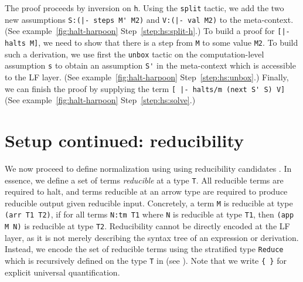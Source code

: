 The proof proceeds by inversion on \lstinline!h!.
Using the \lstinline!split! tactic, we add the two new
assumptions \lstinline!S:(|- steps M' M2)! and
\lstinline!V:(|- val M2)!
to the meta-context. %
(See \Harpoon{} example~\ref{fig:halt-harpoon} Step~\ref{step:hs:split-h}.) %
%
To build a proof for \lstinline![|- halts M]!, we need to show that
there is a step from \lstinline!M! to some value \lstinline!M2!. To
build such a derivation, %
we use first the \lstinline!unbox! tactic on the computation-level
assumption \lstinline!s! to obtain an assumption \lstinline!S'! in the
meta-context which is accessible to the LF layer.
(See \Harpoon{} example~\ref{fig:halt-harpoon} Step~\ref{step:hs:unbox}.)
%
%
Finally, we can finish the proof by supplying the term
\lstinline![ |- halts/m (next S' S) V]!
(See \Harpoon{} example~\ref{fig:halt-harpoon} Step~\ref{step:hs:solve}.)


\section{Setup continued: reducibility}
\label{sec:setup-2}
We now proceed to define normalization using using reducibility candidates
\cite{GirardLafontTaylor:proofsAndTypes}.
In essence, we define a set of terms \emph{reducible} at a type \lstinline!T!. %
All reducible terms are required to halt, and terms reducible at an arrow type
are required to produce reducible output given reducible input.
Concretely,  a term
\lstinline!M! is reducible at type \lstinline!(arr T1 T2)!,
 if for all
terms \lstinline!N:tm T1! where \lstinline!N! is reducible at type
\lstinline!T1!, then \lstinline!(app M N)! is reducible at type \lstinline!T2!.
Reducibility cannot be directly encoded at the LF layer, as it is not
merely describing the syntax tree of an expression or derivation.
Instead, we encode the set of reducible terms using the stratified
type \lstinline!Reduce! which is recursively defined on the type
\lstinline!T! in \Beluga{} (see \cite{JacobRao:stratified2018}). Note
that we write \lstinline!{ }! for explicit universal quantification.

